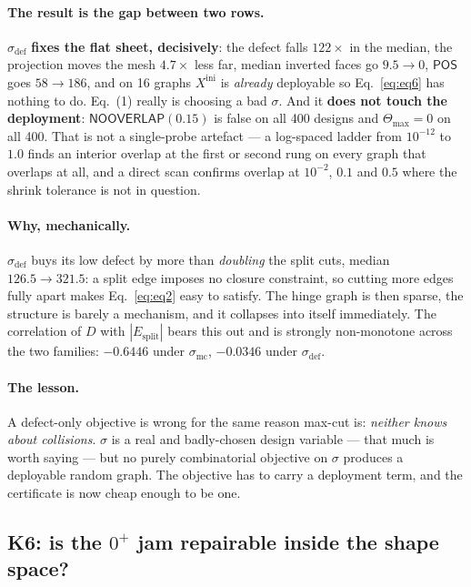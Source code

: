 \documentclass[11pt,a4paper]{article}
\theoremstyle{definition}
\newcommand{\Tmax}{\Theta_{\max}}
\newcommand{\Esplit}{E_{\mathrm{split}}}
\newcommand{\POS}{\textsf{POS}}
\newcommand{\NOOV}{\textsf{NOOVERLAP}}
\begin{document}
\paragraph{The result is the gap between two rows.} $\sigma_{\mathrm{def}}$ \textbf{fixes the
flat sheet, decisively}: the defect falls $122\times$ in the median, the projection moves the
mesh $4.7\times$ less far, median inverted faces go $9.5\to0$, $\POS$ goes $58\to186$, and on
16 graphs $X^{\mathrm{ini}}$ is \emph{already} deployable so Eq.~\eqref{eq:eq6} has nothing to
do. Eq.~(1) really is choosing a bad $\sigma$. And it \textbf{does not touch the deployment}:
$\NOOV(0.15)$ is false on all 400 designs and $\Tmax=0$ on all 400. That is not a
single-probe artefact --- a log-spaced ladder from $10^{-12}$ to $1.0$ finds an interior
overlap at the first or second rung on every graph that overlaps at all, and a direct scan
confirms overlap at $10^{-2}$, $0.1$ and $0.5$ where the shrink tolerance is not in question.

\paragraph{Why, mechanically.} $\sigma_{\mathrm{def}}$ buys its low defect by more than
\emph{doubling} the split cuts, median $126.5\to321.5$: a split edge imposes no closure
constraint, so cutting more edges fully apart makes Eq.~\eqref{eq:eq2} easy to satisfy. The
hinge graph is then sparse, the structure is barely a mechanism, and it collapses into itself
immediately. The correlation of $D$ with $|\Esplit|$ bears this out and is strongly
non-monotone across the two families: $-0.6446$ under $\sigma_{\mathrm{mc}}$, $-0.0346$ under
$\sigma_{\mathrm{def}}$.

\paragraph{The lesson.} A defect-only objective is wrong for the same reason max-cut is:
\emph{neither knows about collisions}. $\sigma$ is a real and badly-chosen design variable ---
that much is worth saying --- but no purely combinatorial objective on $\sigma$ produces a
deployable random graph. The objective has to carry a deployment term, and the certificate is
now cheap enough to be one.

\subsection{K6: is the \texorpdfstring{$0^+$}{0+} jam repairable inside the shape space?}
\end{document}
